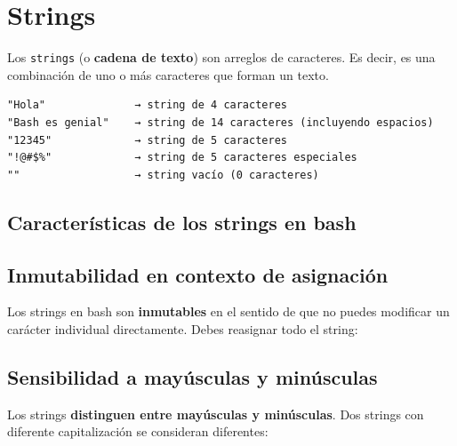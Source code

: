 \documentclass[
  spanish,
  12pt,
  letterpaper,
  DIV=11,
  numbers=noendperiod]{scrreprt}
\newenvironment{Shaded}{\begin{snugshade}}{\end{snugshade}}
\newcommand{\BuiltInTok}[1]{\textcolor[rgb]{0.00,0.23,0.31}{#1}}
\newcommand{\CommentTok}[1]{\textcolor[rgb]{0.37,0.37,0.37}{#1}}
\newcommand{\OperatorTok}[1]{\textcolor[rgb]{0.37,0.37,0.37}{#1}}
\newcommand{\StringTok}[1]{\textcolor[rgb]{0.13,0.47,0.30}{#1}}
\newcommand{\VariableTok}[1]{\textcolor[rgb]{0.07,0.07,0.07}{#1}}
\begin{document}
\section{\texorpdfstring{\textbf{Strings}}{Strings}}\label{strings}

Los \texttt{strings} (o \textbf{cadena de texto}) son arreglos de
caracteres. Es decir, es una combinación de uno o más caracteres que
forman un texto.

\begin{verbatim}
"Hola"              → string de 4 caracteres
"Bash es genial"    → string de 14 caracteres (incluyendo espacios)
"12345"             → string de 5 caracteres
"!@#$%"             → string de 5 caracteres especiales
""                  → string vacío (0 caracteres)
\end{verbatim}

\subsection{Características de los strings en
bash}\label{caracteruxedsticas-de-los-strings-en-bash}

\subsection{Inmutabilidad en contexto de
asignación}\label{inmutabilidad-en-contexto-de-asignaciuxf3n}

Los strings en bash son \textbf{inmutables} en el sentido de que no
puedes modificar un carácter individual directamente. Debes reasignar
todo el string:

\begin{Shaded}
\end{Shaded}

\subsection{Sensibilidad a mayúsculas y
minúsculas}\label{sensibilidad-a-mayuxfasculas-y-minuxfasculas}

Los strings \textbf{distinguen entre mayúsculas y minúsculas}. Dos
strings con diferente capitalización se consideran diferentes:
\end{document}
